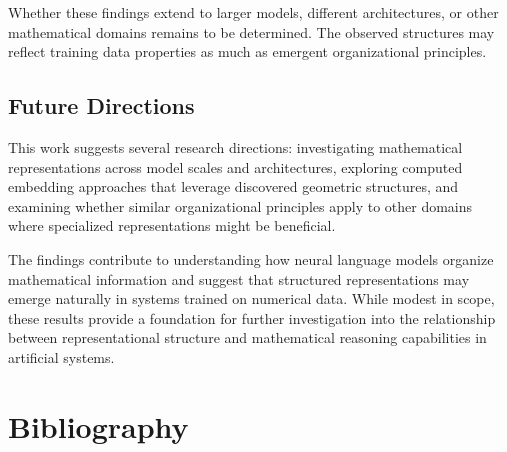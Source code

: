 \documentclass[
  a4paper, twoside, 10pt, titlepage]{book}
\begin{document}
Whether these findings extend to larger models, different architectures,
or other mathematical domains remains to be determined. The observed
structures may reflect training data properties as much as emergent
organizational principles.

\section{Future Directions}\label{future-directions}

This work suggests several research directions: investigating
mathematical representations across model scales and architectures,
exploring computed embedding approaches that leverage discovered
geometric structures, and examining whether similar organizational
principles apply to other domains where specialized representations
might be beneficial.

The findings contribute to understanding how neural language models
organize mathematical information and suggest that structured
representations may emerge naturally in systems trained on numerical
data. While modest in scope, these results provide a foundation for
further investigation into the relationship between representational
structure and mathematical reasoning capabilities in artificial systems.

\chapter*{Bibliography}\label{bibliography}
\end{document}

